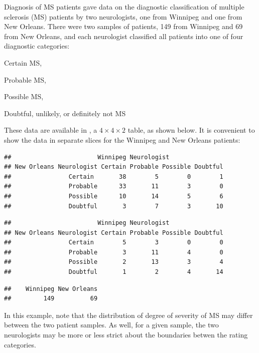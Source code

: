 \documentclass[11pt]{book}
\renewenvironment{knitrout}{\small\renewcommand{\baselinestretch}{.85}}{} %
\begin{document}
\begin{Example}[MS1]{Diagnosis of MS patients}
\citet{LandisKoch:77} gave data on the diagnostic classification
of multiple sclerosis (MS) patients by two neurologists,
one from Winnipeg and one from New Orleans.
There were two samples of patients, 149 from Winnipeg and
69 from New Orleans, and each neurologist classified
all patients
into one of four diagnostic categories:
\begin{seriate}
\item Certain MS,
\item Probable MS,
\item Possible MS,
\item Doubtful, unlikely, or definitely not MS
\end{seriate}

These data are available in ,
a $4 \times 4 \times 2$ table, as shown below.
It is convenient to show the data in separate slices for the Winnipeg
and New Orleans patients:
\begin{knitrout}
\color{fgcolor}\begin{kframe}
\begin{alltt}
\hlstd{MSPatients[,,}\hlstd{]}
\end{alltt}
\begin{verbatim}
##                        Winnipeg Neurologist
## New Orleans Neurologist Certain Probable Possible Doubtful
##                Certain       38        5        0        1
##                Probable      33       11        3        0
##                Possible      10       14        5        6
##                Doubtful       3        7        3       10
\end{verbatim}
\begin{alltt}
\hlstd{MSPatients[,,}\hlstd{]}
\end{alltt}
\begin{verbatim}
##                        Winnipeg Neurologist
## New Orleans Neurologist Certain Probable Possible Doubtful
##                Certain        5        3        0        0
##                Probable       3       11        4        0
##                Possible       2       13        3        4
##                Doubtful       1        2        4       14
\end{verbatim}
\begin{alltt}
       
\end{alltt}
\begin{verbatim}
##    Winnipeg New Orleans 
##         149          69
\end{verbatim}
\end{kframe}
\end{knitrout}
In this example, note that the distribution of degree of severity of
MS may differ between the two patient samples.  As well, for a
given sample, the two neurologists may be more or less strict about
the boundaries betwen the rating categories.


\end{Example}
\end{document}

